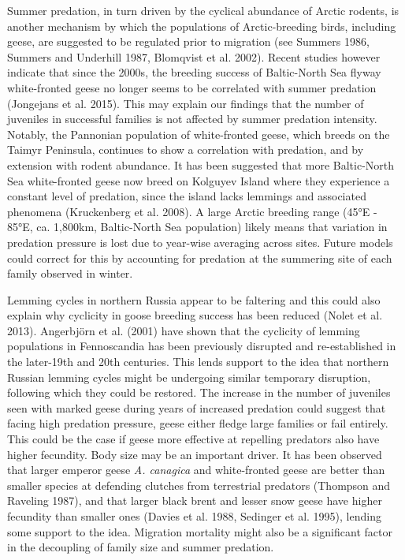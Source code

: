 \documentclass[10pt,twocolumn]{paper}
\begin{document}
Summer predation, in turn driven by the cyclical abundance of Arctic
rodents, is another mechanism by which the populations of
Arctic-breeding birds, including geese, are suggested to be regulated
prior to migration (see Summers 1986, Summers and Underhill 1987,
Blomqvist et al. 2002). Recent studies however indicate that since the
2000s, the breeding success of Baltic-North Sea flyway white-fronted
geese no longer seems to be correlated with summer predation (Jongejans
et al. 2015). This may explain our findings that the number of juveniles
in successful families is not affected by summer predation intensity.
Notably, the Pannonian population of white-fronted geese, which breeds
on the Taimyr Peninsula, continues to show a correlation with predation,
and by extension with rodent abundance. It has been suggested that more
Baltic-North Sea white-fronted geese now breed on Kolguyev Island where
they experience a constant level of predation, since the island lacks
lemmings and associated phenomena (Kruckenberg et al. 2008). A large
Arctic breeding range (45°E - 85°E, ca. 1,800km, Baltic-North Sea
population) likely means that variation in predation pressure is lost
due to year-wise averaging across sites. Future models could correct for
this by accounting for predation at the summering site of each family
observed in winter.

Lemming cycles in northern Russia appear to be faltering and this could
also explain why cyclicity in goose breeding success has been reduced
(Nolet et al. 2013). Angerbjörn et al. (2001) have shown that the
cyclicity of lemming populations in Fennoscandia has been previously
disrupted and re-established in the later-19th and 20th centuries. This
lends support to the idea that northern Russian lemming cycles might be
undergoing similar temporary disruption, following which they could be
restored. The increase in the number of juveniles seen with marked geese
during years of increased predation could suggest that facing high
predation pressure, geese either fledge large families or fail entirely.
This could be the case if geese more effective at repelling predators
also have higher fecundity. Body size may be an important driver. It has
been observed that larger emperor geese \emph{A. canagica} and
white-fronted geese are better than smaller species at defending
clutches from terrestrial predators (Thompson and Raveling 1987), and
that larger black brent and lesser snow geese have higher fecundity than
smaller ones (Davies et al. 1988, Sedinger et al. 1995), lending some
support to the idea. Migration mortality might also be a significant
factor in the decoupling of family size and summer predation.
\end{document}
